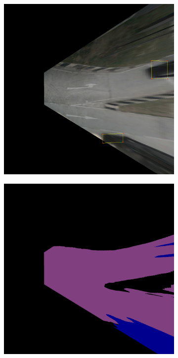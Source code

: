 \begin{figure}[!ht]
    \centering
    \begin{subfigure}[b]{0.22\textwidth}
        \includegraphics[width=\textwidth]{images/methodology/bev_occupancy_oclusion/bev_cuboid_9.png}
        \caption{}
        \label{fig:bev_occupancy_occlusion_a}
    \end{subfigure}
    \hfill
    \begin{subfigure}[b]{0.22\textwidth}
        \includegraphics[width=\textwidth]{images/methodology/bev_occupancy_oclusion/bev_semantic_color_9.png}

\end{subfigure}
\end{figure}
